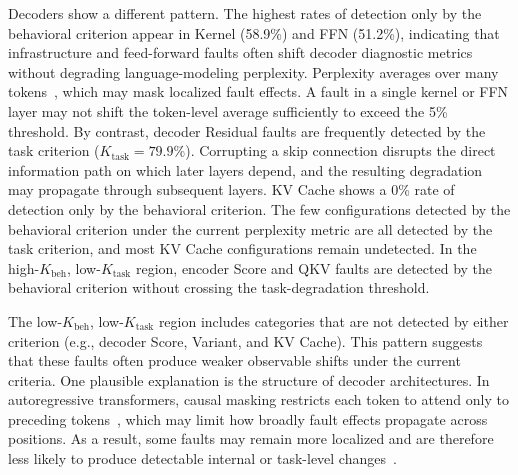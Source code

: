 Decoders show a different pattern. The highest rates of detection only by the behavioral criterion appear in Kernel (58.9\%) and FFN (51.2\%), indicating that infrastructure and feed-forward faults often shift decoder diagnostic metrics without degrading language-modeling perplexity. Perplexity averages over many tokens~\cite{liang2025attnchecker}, which may mask localized fault effects. A fault in a single kernel or FFN layer may not shift the token-level average sufficiently to exceed the 5\% threshold. By contrast, decoder Residual faults are frequently detected by the task criterion ($K_{\text{task}}=79.9\%$). Corrupting a skip connection disrupts the direct information path on which later layers depend, and the resulting degradation may propagate through subsequent layers. KV Cache shows a 0\% rate of detection only by the behavioral criterion. The few configurations detected by the behavioral criterion under the current perplexity metric are all detected by the task criterion, and most KV Cache configurations remain undetected. In the high-$K_{\text{beh}}$, low-$K_{\text{task}}$ region, encoder Score and QKV faults are detected by the behavioral criterion without crossing the task-degradation threshold.

The low-$K_{\text{beh}}$, low-$K_{\text{task}}$ region includes categories that are not detected by either criterion (e.g., decoder Score, Variant, and KV Cache). This pattern suggests that these faults often produce weaker observable shifts under the current criteria. One plausible explanation is the structure of decoder architectures. In autoregressive transformers, causal masking restricts each token to attend only to preceding tokens~\cite{vaswani2017attention,black2021gptneo}, which may limit how broadly fault effects propagate across positions. As a result, some faults may remain more localized and are therefore less likely to produce detectable internal or task-level changes~\cite{vaswani2017attention,job2025hebcgnn}.

